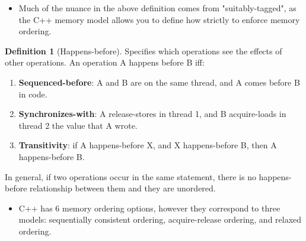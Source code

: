 \documentclass[11pt, a4paper]{article}
\theoremstyle{definition}
\newtheorem{definition}[theorem]{Definition}
\theoremstyle{remark}
\begin{document}
\begin{itemize}
    \item Much of the nuance in the above definition comes from "suitably-tagged", as the C++ memory model allows you to define how strictly to enforce memory ordering.
\end{itemize}
\begin{definition}[Happens-before]
Specifies which operations see the effects of other operations. An operation A happens before B iff:
\begin{enumerate}
    \item \textbf{Sequenced-before}: A and B are on the same thread, and A comes before B in code.
    \item \textbf{Synchronizes-with}: A release-stores in thread 1, and B acquire-loads in thread 2 the value that A wrote.
    \item \textbf{Transitivity}: if A happens-before X, and X happens-before B, then A happens-before B.
\end{enumerate}
In general, if two operations occur in the same statement, there is no happens-before relationship between them and they are unordered. 
\end{definition}
\begin{itemize}
    \item C++ has 6 memory ordering options, however they correspond to three models: sequentially consistent ordering, acquire-release ordering, and relaxed ordering.
\end{itemize}
\end{document}

